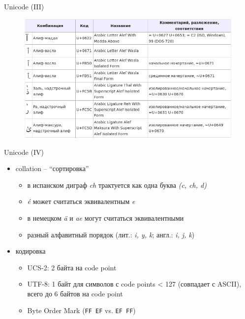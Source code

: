 \documentclass{beamer}
\begin{document}
\begin{frame}{Unicode (III)}
\begin{figure}[H]
    \includegraphics[scale=0.35]{combining-arabic.png} 
\end{figure}
\end{frame}

\begin{frame}{Unicode (IV)}
\begin{itemize}
	\item collation -- ``сортировка''
	    \begin{itemize}
	        \item в испанском диграф \textit{ch} трактуется как одна буква \textit{(c, ch, d)}
            \item \textit{\'{e}} может считаться эквивалентным \textit{e}
	        \item в немецком \textit{\"{a}} и \textit{ae} могут считаться эквивалентными
	        \item разный алфавитный порядок (лит.: \textit{i, y, k}; англ.: \textit{i, j, k})
	    \end{itemize}	
	\medskip
	\item кодировка
	    \begin{itemize}
	        \item UCS-2: 2 байта на code point 
            \item UTF-8: 1 байт для символов с code points < 127 (совпадает с ASCII), всего до 6 байтов на code point
            \item Byte Order Mark (\texttt{FF\,EF} vs. \texttt{EF\,FF})
	    \end{itemize}	
\end{itemize}
\end{frame}
\end{document}
